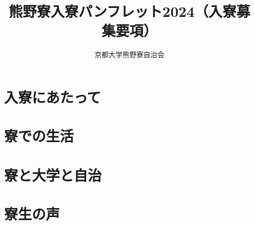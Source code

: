 \documentclass[10pt,a4j,dvipdfmx,openany,uplatex]{jsbook}
\title{熊野寮入寮パンフレット2024（入寮募集要項）}
\author{京都大学熊野寮自治会}
\date{}
\begin{document}

  {\small
  \setcounter{tocdepth}{1}%
  \tableofcontents
  }

 
\chapter{入寮にあたって}


  

  \vspace{10mm}

  

  \newpage
  



\chapter{寮での生活}

  

  \newpage

  

  \newpage

  

  \newpage
  
  
  
  \newpage
  
  

  

\chapter{寮と大学と自治}
  
  \clearpage
  
  \clearpage
  
  \clearpage
  

  \newpage
  
  

\chapter{寮生の声}
  
  \newpage
  
  \newpage
  
\end{document}
